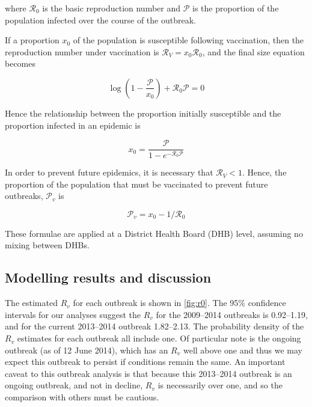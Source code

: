 \documentclass{article}
\newcommand{\Pe}{\mathcal{P}}
\newcommand{\Ro}{\mathcal{R}_0}
\newcommand{\Pv}{\mathcal{P}_v}
\newcommand{\Rr}{\mathcal{R}}
\begin{document}
where $\Ro$ is the basic reproduction number and $\Pe$ is the proportion of the population infected over the course of the outbreak.

If a proportion $x_0$ of the population is susceptible following vaccination, then the  reproduction number under vaccination is $\Rr_V=x_0\Ro$, and the final size equation becomes

\begin{equation} \label{eq:eqn2}
\log\left(1-\frac{\Pe}{x_0}\right)+\Ro\Pe=0
\end{equation}

Hence the relationship between the proportion initially susceptible and the proportion infected in an epidemic is

\begin{equation} \label{eq:eqn3}
x_0=\frac{\Pe}{1-e^{-\Ro\Pe}}
\end{equation}

In order to prevent future epidemics, it is necessary that $\Rr_V<1$. Hence, the proportion of the population that must be vaccinated to prevent future outbreaks, $\Pv$ is

\begin{equation} \label{eq:prop}
\Pv = x_0-1/\Ro
\end{equation}

These formulae are applied at a District Health Board (DHB) level, assuming no mixing between DHBs.

\subsection{Modelling results and discussion}

The estimated $R_v$ for each outbreak is shown in \autoref{fig:r0}. The 95\% confidence intervals for our analyses suggest the $R_v$ for the 2009--2014 outbreaks is 0.92--1.19, and for the current 2013--2014 outbreak 1.82--2.13. The probability density of the $R_v$ estimates for each outbreak all include one. Of particular note is the ongoing outbreak (as of 12 June 2014), which has an $R_v$ well above one and thus we may expect this outbreak to persist if conditions remain the same. An important caveat to this outbreak analysis is that because this 2013--2014 outbreak is an ongoing outbreak, and not in decline, $R_v$ is necessarily over one, and so the comparison with others must be cautious.
\end{document}
